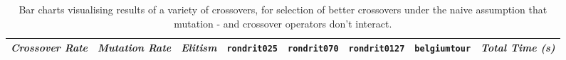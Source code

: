 
\begin{table}[H]
\centering
\footnotesize
{\renewcommand{\arraystretch}{1}}
\begin{tabular}{ccc|c|c|c|c|c}
\textit{Crossover Rate} & \textit{Mutation Rate} & \textit{Elitism} & \texttt{rondrit025} & \texttt{rondrit070} & \texttt{rondrit0127} & \texttt{belgiumtour} & \textit{Total Time (s)} \\\hline
\end{tabular}
\caption{Bar charts visualising results of a variety of crossovers, for selection of better crossovers under the naive assumption that mutation - and crossover operators don't interact.}
\label{tab:res5}
\end{table}


